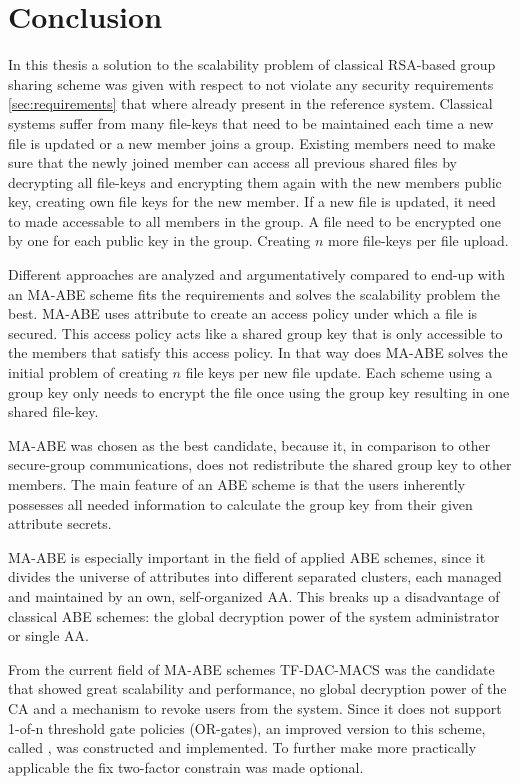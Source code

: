 \chapter{Conclusion}
In this thesis a solution to the scalability problem of classical RSA-based group sharing scheme was given with respect to not violate any security requirements \ref{sec:requirements} that where already present in the reference system. Classical systems suffer from many file-keys that need to be maintained each time a new file is updated or a new member joins a group. Existing members need to make sure that the newly joined member can access all previous shared files by decrypting all file-keys and encrypting them again with the new members public key, creating own file keys for the new member. If a new file is updated, it need to made accessable to all members in the group. A file need to be encrypted one by one for each public key in the group. Creating $n$ more file-keys per file upload.

Different approaches are analyzed and argumentatively compared to end-up with an MA-ABE scheme fits the requirements and solves the scalability problem the best.  MA-ABE uses attribute to create an access policy under which a file is secured. This access policy acts like a shared group key that is only accessible to the members that satisfy this access policy. In that way does MA-ABE solves the initial problem of creating $n$ file keys per new file update. Each scheme using a group key only needs to encrypt the file once using the group key resulting in one shared file-key. 

MA-ABE was chosen as the best candidate, because it, in comparison to other secure-group communications, does not redistribute the shared group key to other members. The main feature of an ABE scheme is that the users inherently possesses all needed information to calculate the group key from their given attribute secrets. 

MA-ABE is especially important in the field of applied ABE schemes, since it divides the universe of attributes into different separated clusters, each managed and maintained by an own, self-organized AA. This breaks up a disadvantage of classical ABE schemes: the global decryption power of the system administrator or single AA. 

From the current field of MA-ABE schemes TF-DAC-MACS was the candidate that showed great scalability and performance, no global decryption power of the CA and a mechanism to revoke users from the system. Since it does not support 1-of-n threshold gate policies (OR-gates), an improved version to this scheme, called \name, was constructed and implemented. To further make \name more practically applicable the fix two-factor constrain was made optional. 

